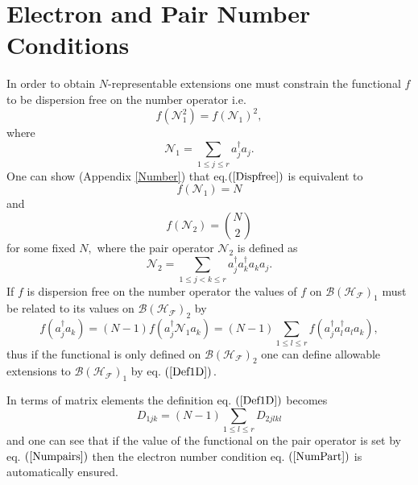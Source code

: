 \documentclass[aps,preprint]{revtex4}%
\begin{document}
\section{Electron and Pair Number Conditions \label{PartPair}}

In order to obtain $N$-representable extensions one must constrain the
functional $f$ to be dispersion free on the number operator i.e.
\begin{equation}
f\left(  \mathcal{N}_{1}^{2}\right)  =f\left(  \mathcal{N}_{1}\right)  ^{2},
\label{Dispfree}%
\end{equation}
where
\begin{equation}
\mathcal{N}_{1}=\sum_{1\leq j\leq r}a_{j}^{\dagger}a_{j}.
\end{equation}
One can show (Appendix \ref{Number}) that eq.$\left(  \ref{Dispfree}\right)  $
is equivalent to
\begin{equation}
f\left(  \mathcal{N}_{1}\right)  =N \label{NumPart}%
\end{equation}
and
\begin{equation}
f\left(  \mathcal{N}_{2}\right)  =\binom{N}{2} \label{Numpairs}%
\end{equation}
for some fixed $N,$ where the pair operator $\mathcal{N}_{2}$ is defined as
\begin{equation}
\mathcal{N}_{2}=\sum_{1\leq j<k\leq r}a_{j}^{\dagger}a_{k}^{\dagger}a_{k}%
a_{j}.
\end{equation}
If $f$ is dispersion free on the number operator the values of $f$ on
$\mathcal{B}\left(  \mathcal{H}_{\mathcal{F}}\right)  _{1}$ must be related to
its values on $\mathcal{B}\left(  \mathcal{H}_{\mathcal{F}}\right)  _{2}$ by
\begin{equation}
f\left(  a_{j}^{\dagger}a_{k}\right)  =\left(  N-1\right)  f\left(
a_{j}^{\dagger}\mathcal{N}_{1}a_{k}\right)  =\left(  N-1\right)  \sum_{1\leq
l\leq r}f\left(  a_{j}^{\dagger}a_{l}^{\dagger}a_{l}a_{k}\right)  ,
\label{Def1D}%
\end{equation}
thus if the functional is only defined on $\mathcal{B}\left(  \mathcal{H}%
_{\mathcal{F}}\right)  _{2}$ one can define allowable extensions to
$\mathcal{B}\left(  \mathcal{H}_{\mathcal{F}}\right)  _{1}$ by eq. $\left(
\ref{Def1D}\right)  .$

In terms of matrix elements the definition eq. $\left(  \ref{Def1D}\right)  $
becomes
\begin{equation}
D_{1jk}=\left(  N-1\right)  \sum_{1\leq l\leq r}D_{2jlkl}%
\end{equation}
and one can see that if the value of the functional on the pair operator is
set by eq. $\left(  \ref{Numpairs}\right)  $ then the electron number
condition eq. $\left(  \ref{NumPart}\right)  $ is automatically ensured.
\end{document}
